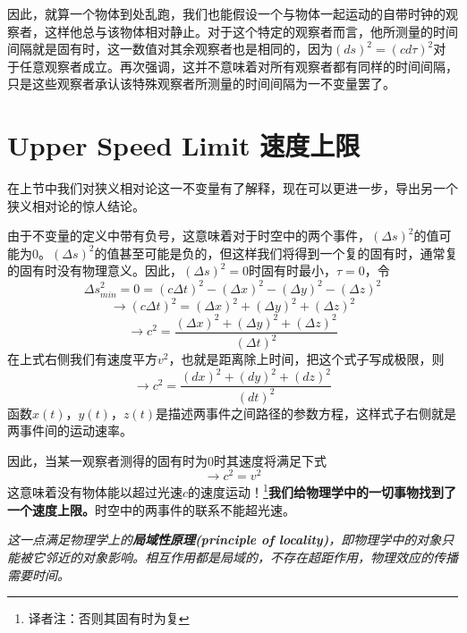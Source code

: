 因此，就算一个物体到处乱跑，我们也能假设一个与物体一起运动的自带时钟的观察者，这样他总与该物体相对静止。对于这个特定的观察者而言，他所测量的时间间隔就是固有时，这一数值对其余观察者也是相同的，因为$(ds)^2=(cd\tau)^2$对于任意观察者成立。再次强调，这并不意味着对所有观察者都有同样的时间间隔，只是这些观察者承认该特殊观察者所测量的时间间隔为一不变量罢了。

\section[速度上限]{Upper Speed Limit \quad 速度上限}
\label{sec2.3}
在上节中我们对狭义相对论这一不变量有了解释，现在可以更进一步，导出另一个狭义相对论的惊人结论。

由于不变量的定义中带有负号，这意味着对于时空中的两个事件，$(\Delta s)^2$的值可能为0。$(\Delta s)^2$的值甚至可能是负的，但这样我们将得到一个复的固有时，通常复的固有时没有物理意义。因此，$(\Delta s)^2=0$时固有时最小，$\tau=0$，令
\[
\Delta s^2_{min}
=0=(c \Delta t)^2-(\Delta x)^2-(\Delta y)^2-(\Delta z)^2
\]
\[
\rightarrow (c \Delta t)^2
=(\Delta x)^2+(\Delta y)^2+(\Delta z)^2
\]
\begin{equation}\label{equ2.20}
 \rightarrow c^2=
  \frac{(\Delta x)^2+(\Delta y)^2+(\Delta z)^2}{(\Delta t)^2}
\end{equation}
在上式右侧我们有速度平方$v^2$，也就是距离除上时间，把这个式子写成极限，则
\begin{equation}\label{equ2.21}
 \rightarrow c^2=\frac{(d x)^2+(d y)^2+(d z)^2}{(dt)^2}
\end{equation}
函数$x(t)$，$y(t)$，$z(t)$是描述两事件之间路径的参数方程，这样式子右侧就是两事件间的运动速率。

因此，当某一观察者测得的固有时为$0$时其速度将满足下式
\begin{equation}\label{equ2.22}
  \rightarrow c^2 =v^2
\end{equation}
这意味着没有物体能以超过光速$c$的速度运动！\footnote{译者注：否则其固有时为复}{\bf{我们给物理学中的一切事物找到了一个速度上限。}}时空中的两事件的联系不能超光速。

{\it{这一点满足物理学上的{\bf{局域性原理(principle of locality)}}，即物理学中的对象只能被它邻近的对象影响。相互作用都是局域的，不存在超距作用，物理效应的传播需要时间。}}

